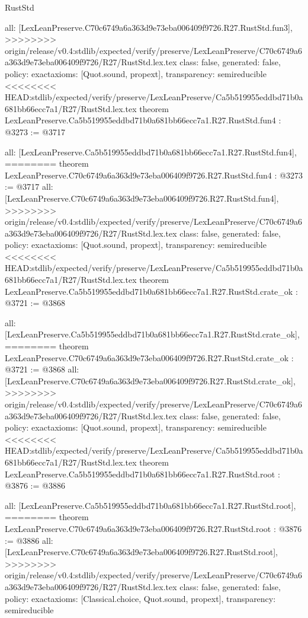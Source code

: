 \begin{lexlean}{RustStd}
\begin{coremodule}
{\begin{coremodule}
{{{{{{{  all: [LexLeanPreserve.C70c6749a6a363d9e73eba006409f9726.R27.RustStd.fun3],
>>>>>>>> origin/release/v0.4:stdlib/expected/verify/preserve/LexLeanPreserve/C70c6749a6a363d9e73eba006409f9726/R27/RustStd.lex.tex
  class: false,
  generated: false,
  policy: exact{axioms: [Quot.sound, propext]},
  transparency: semireducible
}
<<<<<<<< HEAD:stdlib/expected/verify/preserve/LexLeanPreserve/Ca5b519955eddbd71b0a681bb66ecc7a1/R27/RustStd.lex.tex
theorem LexLeanPreserve.Ca5b519955eddbd71b0a681bb66ecc7a1.R27.RustStd.fun4 : @3273 := @3717 {
  all: [LexLeanPreserve.Ca5b519955eddbd71b0a681bb66ecc7a1.R27.RustStd.fun4],
========
theorem LexLeanPreserve.C70c6749a6a363d9e73eba006409f9726.R27.RustStd.fun4 : @3273 := @3717 {
  all: [LexLeanPreserve.C70c6749a6a363d9e73eba006409f9726.R27.RustStd.fun4],
>>>>>>>> origin/release/v0.4:stdlib/expected/verify/preserve/LexLeanPreserve/C70c6749a6a363d9e73eba006409f9726/R27/RustStd.lex.tex
  class: false,
  generated: false,
  policy: exact{axioms: [Quot.sound, propext]},
  transparency: semireducible
}
<<<<<<<< HEAD:stdlib/expected/verify/preserve/LexLeanPreserve/Ca5b519955eddbd71b0a681bb66ecc7a1/R27/RustStd.lex.tex
theorem LexLeanPreserve.Ca5b519955eddbd71b0a681bb66ecc7a1.R27.RustStd.crate_ok : @3721 := @3868 {
  all: [LexLeanPreserve.Ca5b519955eddbd71b0a681bb66ecc7a1.R27.RustStd.crate_ok],
========
theorem LexLeanPreserve.C70c6749a6a363d9e73eba006409f9726.R27.RustStd.crate_ok : @3721 := @3868 {
  all: [LexLeanPreserve.C70c6749a6a363d9e73eba006409f9726.R27.RustStd.crate_ok],
>>>>>>>> origin/release/v0.4:stdlib/expected/verify/preserve/LexLeanPreserve/C70c6749a6a363d9e73eba006409f9726/R27/RustStd.lex.tex
  class: false,
  generated: false,
  policy: exact{axioms: [Quot.sound, propext]},
  transparency: semireducible
}
<<<<<<<< HEAD:stdlib/expected/verify/preserve/LexLeanPreserve/Ca5b519955eddbd71b0a681bb66ecc7a1/R27/RustStd.lex.tex
theorem LexLeanPreserve.Ca5b519955eddbd71b0a681bb66ecc7a1.R27.RustStd.root : @3876 := @3886 {
  all: [LexLeanPreserve.Ca5b519955eddbd71b0a681bb66ecc7a1.R27.RustStd.root],
========
theorem LexLeanPreserve.C70c6749a6a363d9e73eba006409f9726.R27.RustStd.root : @3876 := @3886 {
  all: [LexLeanPreserve.C70c6749a6a363d9e73eba006409f9726.R27.RustStd.root],
>>>>>>>> origin/release/v0.4:stdlib/expected/verify/preserve/LexLeanPreserve/C70c6749a6a363d9e73eba006409f9726/R27/RustStd.lex.tex
  class: false,
  generated: false,
  policy: exact{axioms: [Classical.choice, Quot.sound, propext]},
  transparency: semireducible
}

}}}}}}}}}
\end{coremodule}}
\end{coremodule}
\end{lexlean}
